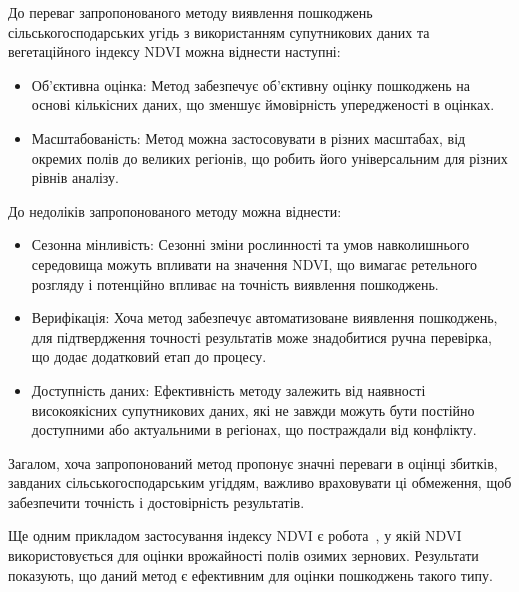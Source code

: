 До переваг запропонованого методу виявлення пошкоджень
сільськогосподарських угідь з використанням супутникових
даних та вегетаційного індексу NDVI можна віднести наступні:

\begin{itemize}

      \item Об'єктивна оцінка: Метод забезпечує
            об'єктивну оцінку пошкоджень на основі
            кількісних даних, що зменшує ймовірність
            упередженості в оцінках.
      \item Масштабованість: Метод можна
            застосовувати в різних масштабах,
            від окремих полів до великих регіонів,
            що робить його універсальним для різних рівнів аналізу.

\end{itemize}

До недоліків запропонованого методу можна віднести:

\begin{itemize}

      \item Сезонна мінливість: Сезонні
            зміни рослинності та умов навколишнього
            середовища можуть впливати на значення NDVI,
            що вимагає ретельного розгляду і потенційно
            впливає на точність виявлення пошкоджень.
      \item Верифікація: Хоча метод забезпечує
            автоматизоване виявлення пошкоджень,
            для підтвердження точності результатів може
            знадобитися ручна перевірка, що додає додатковий
            етап до процесу.
      \item Доступність даних: Ефективність
            методу залежить від наявності високоякісних
            супутникових даних, які не завжди можуть
            бути постійно доступними або актуальними в
            регіонах, що постраждали від конфлікту.

\end{itemize}

Загалом, хоча запропонований метод пропонує значні переваги
в оцінці збитків, завданих сільськогосподарським угіддям,
важливо враховувати ці обмеження, щоб забезпечити точність
і достовірність результатів.

Ще одним прикладом застосування індексу NDVI є робота~\cite{deininger2023}, у якій
NDVI використовується для оцінки врожайності полів озимих зернових. Результати
показують, що даний метод є ефективним для оцінки пошкоджень такого типу.


